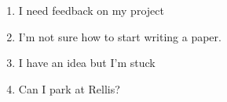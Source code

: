 \begin{enumerate}
    \item I need feedback on my project
    \item I'm not sure how to start writing a paper.
    \item I have an idea but I’m stuck 
    \item Can I park at Rellis?
\end{enumerate}